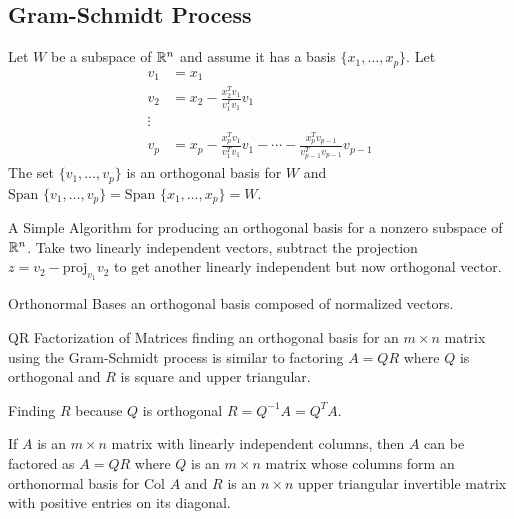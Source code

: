 \begin{card}
    \subsection{Gram-Schmidt Process}

    \begin{theorem}
    Let $W$ be a subspace of $\mathbb{R}^n$ and assume it has a basis $\{x_1, \dotsc, x_p\}$.
    Let
    \begin{align*}
    v_1 &= x_1
    \\
    v_2 &= x_2 -  \frac{x_2^Tv_1}{v_1^Tv_1}v_1
    \\
    \vdots&
    \\
    v_p &= x_p - \frac{x_p^Tv_1}{v_1^Tv_1}v_1 - \dotsb
              - \frac{x_p^Tv_{p-1}}{v_{p-1}^Tv_{p-1}}v_{p-1}
    \end{align*}
    The set $\{v_1, \dotsc, v_p\}$ is an orthogonal basis for $W$
    and $\text{Span } \{v_1, \dotsc, v_p\} = \text{Span } \{x_1, \dotsc, x_p\} = W$.

    \end{theorem}

    \begin{compactdesc}
    \item[A Simple Algorithm] for producing an orthogonal basis for
        a nonzero subspace of $\mathbb{R}^n$.
        Take two linearly independent vectors, subtract the projection
        $z = v_2 - \text{proj}_{v_1}v_2$
        to get another linearly independent but now orthogonal vector.
    \item[Orthonormal Bases] an orthogonal basis composed of normalized vectors.
    \item[QR Factorization of Matrices] finding an orthogonal basis for an
        $m \times n$ matrix using the Gram-Schmidt process is similar to
        factoring $A = QR$ where $Q$ is orthogonal and $R$ is square and upper triangular.
    \item[Finding $R$] because $Q$ is orthogonal $R = Q^{-1}A = Q^TA$.
    \end{compactdesc}

    \begin{theorem}[QR Factorization]
    If $A$ is an $m \times n$ matrix with linearly independent columns, then
    $A$ can be factored as $A = QR$ where $Q$ is an $m \times n$ matrix
    whose columns form an orthonormal basis for Col $A$
    and $R$ is an $n \times n$ upper triangular invertible matrix
    with positive entries on its diagonal.
    \end{theorem}

\end{card}


